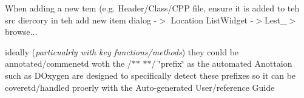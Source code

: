 When adding a new tem (e.\+g. Header/\+Class/\+C\+PP file, ensure it is added to teh src diercory in teh add new item dialog -\/$>$ Location List\+Widget -\/$>$Lest\+\_\+$>$ browse...

ideally ({\itshape particualrly with key functions/methods}) they could be annotated/commenetd woth the /$\ast$$\ast$ $\ast$$\ast$/ \char`\"{}prefix\char`\"{} as the automated Anottaion such as D\+Oxygen are designed to specifically detect these prefixes so it can be coveretd/handled proerly with the Auto-\/generated User/reference Guide 